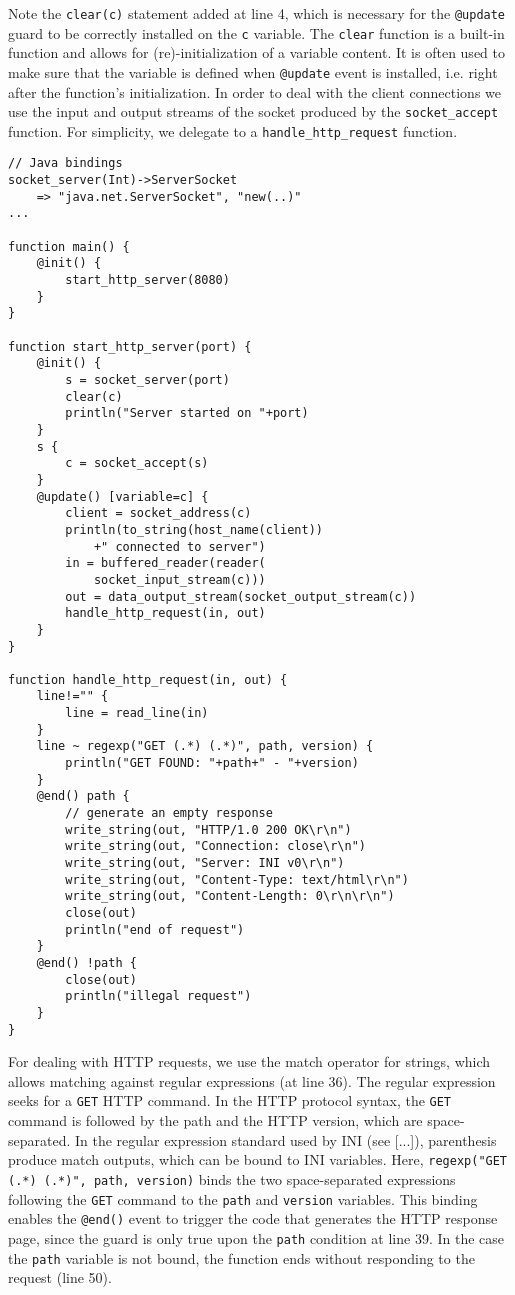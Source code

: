 \documentclass[11pt]{report}
\begin{document}
Note the \texttt{clear(c)} statement added at line 4, which is necessary for the \texttt{@update} guard to be correctly installed on the \texttt{c} variable. The \texttt{clear} function is a built-in function and allows for (re)-initialization of a variable content. It is often used to make sure that the variable is defined when \texttt{@update} event is installed, i.e. right after the function's initialization. In order to deal with the client connections we use the input and output streams of the socket produced by the \texttt{socket\_accept} function. For simplicity, we delegate to a \texttt{handle\_http\_request} function.

\begin{lstlisting}
// Java bindings
socket_server(Int)->ServerSocket
	=> "java.net.ServerSocket", "new(..)"
...
	
function main() {
	@init() {
		start_http_server(8080)
	}
}

function start_http_server(port) {
	@init() {
		s = socket_server(port)
		clear(c)
		println("Server started on "+port)
	}
	s {
		c = socket_accept(s)
	}
	@update() [variable=c] {
		client = socket_address(c)
		println(to_string(host_name(client))
			+" connected to server")
		in = buffered_reader(reader(
			socket_input_stream(c)))
		out = data_output_stream(socket_output_stream(c))
		handle_http_request(in, out)
	}		
}

function handle_http_request(in, out) {
	line!="" {
		line = read_line(in)
	}
	line ~ regexp("GET (.*) (.*)", path, version) {
		println("GET FOUND: "+path+" - "+version)
	}
	@end() path {
		// generate an empty response
		write_string(out, "HTTP/1.0 200 OK\r\n")
		write_string(out, "Connection: close\r\n")
		write_string(out, "Server: INI v0\r\n")
		write_string(out, "Content-Type: text/html\r\n")
		write_string(out, "Content-Length: 0\r\n\r\n")
		close(out)
		println("end of request")
	}
	@end() !path {
		close(out)
		println("illegal request")
	}
}
\end{lstlisting}

For dealing with HTTP requests, we use the match operator for strings, which allows matching against regular expressions (at line 36). The regular expression seeks for a \texttt{GET} HTTP command. In the HTTP protocol syntax, the \texttt{GET} command is followed by the path and the HTTP version, which are space-separated. In the regular expression \cite{friedl2006} standard used by INI (see [...]), parenthesis produce match outputs, which can be bound to INI variables. Here, \texttt{regexp("GET (.*) (.*)", path, version)} binds the two space-separated expressions following the \texttt{GET} command to the \texttt{path} and \texttt{version} variables. This binding enables the \texttt{@end()} event to trigger the code that generates the HTTP response page, since the guard is only true upon the \texttt{path} condition at line 39. In the case the \texttt{path} variable is not bound, the function ends without responding to the request (line 50).
\end{document}
